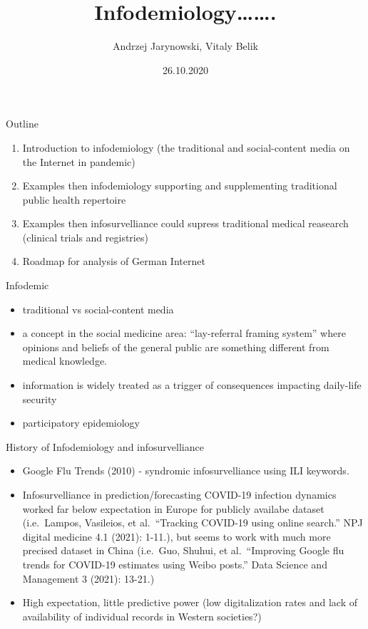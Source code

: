 \documentclass[
  10pt,
  ignorenonframetext,
  a4paper,handout]{beamer}
\title{Infodemiology\ldots\ldots.}
\author{Andrzej Jarynowski, Vitaly Belik}
\date{26.10.2020}
\institute{Institute of Veterinary Epidemiology and Biostatistics, Freie
Universität Berlin, Germany}
\providecommand{\tightlist}{%
  \setlength{\itemsep}{0pt}\setlength{\parskip}{0pt}}
\begin{document}
\frame{\titlepage}

\begin{frame}{Outline}
\protect\hypertarget{outline}{}
\Large
\pause

\begin{enumerate}
[1)]
\item
  Introduction to infodemiology (the traditional and social-content
  media on the Internet in pandemic)
\item
  Examples then infodemiology supporting and supplementing traditional
  public health repertoire
\item
  Examples then infosurvelliance could supress traditional medical
  reasearch (clinical trials and registries)
\item
  Roadmap for analysis of German Internet
\end{enumerate}

\large

\pause
\end{frame}

\begin{frame}{Infodemic}
\protect\hypertarget{infodemic}{}
\begin{itemize}
\tightlist
\item
  traditional vs social-content media
\item
  a concept in the social medicine area: ``lay-referral framing system''
  where opinions and beliefs of the general public are something
  different from medical knowledge.
\item
  information is widely treated as a trigger of consequences impacting
  daily-life security
\item
  participatory epidemiology
\end{itemize}
\end{frame}

\begin{frame}{History of Infodemiology and infosurvelliance}
\protect\hypertarget{history-of-infodemiology-and-infosurvelliance}{}
\begin{itemize}
\item
  Google Flu Trends (2010) - syndromic infosurvelliance using ILI
  keywords.
\item
  Infosurvelliance in prediction/forecasting COVID-19 infection dynamics
  worked far below expectation in Europe for publicly availabe dataset
  (i.e.~Lampos, Vasileios, et al.~``Tracking COVID-19 using online
  search.'' NPJ digital medicine 4.1 (2021): 1-11.), but seems to work
  with much more precised dataset in China (i.e.~Guo, Shuhui, et
  al.~``Improving Google flu trends for COVID-19 estimates using Weibo
  posts.'' Data Science and Management 3 (2021): 13-21.)
\item
  High expectation, little predictive power (low digitalization rates
  and lack of availability of individual records in Western societies?)
\end{itemize}
\end{frame}
\end{document}
